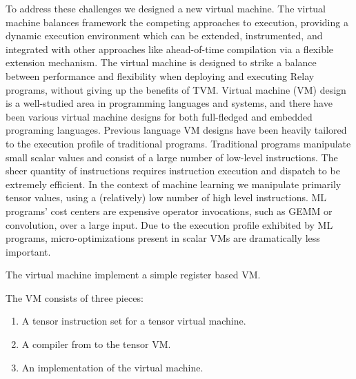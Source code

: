 To address these challenges we designed a new \relay
  virtual machine.
The \relay virtual machine balances framework the competing approaches to execution,
  providing a dynamic execution environment which can be extended, instrumented, and integrated with other approaches
  like ahead-of-time compilation via a flexible extension mechanism.
The virtual machine is designed to strike a balance between performance and flexibility
  when deploying and executing Relay programs, without giving up the benefits of TVM.
Virtual machine (VM) design is a well-studied area in programming languages and systems,
  and there have been various virtual machine designs for both full-fledged and embedded programing languages.
Previous language VM designs have been heavily tailored to the execution profile of traditional programs.
Traditional programs manipulate small scalar values
  and consist of a large number of low-level instructions.
The sheer quantity of instructions requires instruction execution
  and dispatch to be extremely efficient.
In the context of machine learning we manipulate primarily tensor values,
  using a (relatively) low number of high level instructions.
ML programs’ cost centers are expensive operator invocations,
  such as GEMM or convolution, over a large input.
Due to the execution profile exhibited by ML programs,
  micro-optimizations present in scalar VMs are dramatically less important.

The \relay virtual machine implement a simple register based VM.

The VM consists of three pieces:
\begin{enumerate}
  \item A tensor instruction set for a tensor virtual machine.
  \item A compiler from \relay to the tensor VM.
  \item An implementation of the virtual machine.
\end{enumerate}

